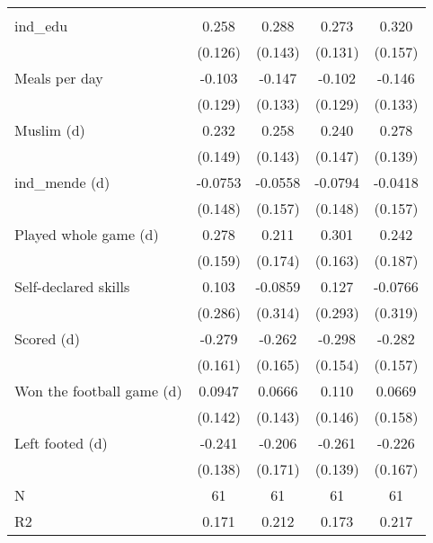 {\begin{tabular}{l*{4}{c}}
                    &                     &                     &                     &                     \\
[1em]
ind\_edu             &       0.258\sym{**} &       0.288\sym{**} &       0.273\sym{**} &       0.320\sym{**} \\
                    &     (0.126)         &     (0.143)         &     (0.131)         &     (0.157)         \\
[1em]
Meals per day       &      -0.103         &      -0.147         &      -0.102         &      -0.146         \\
                    &     (0.129)         &     (0.133)         &     (0.129)         &     (0.133)         \\
[1em]
Muslim (d)          &       0.232         &       0.258\sym{*}  &       0.240         &       0.278\sym{**} \\
                    &     (0.149)         &     (0.143)         &     (0.147)         &     (0.139)         \\
[1em]
ind\_mende (d)       &     -0.0753         &     -0.0558         &     -0.0794         &     -0.0418         \\
                    &     (0.148)         &     (0.157)         &     (0.148)         &     (0.157)         \\
[1em]
Played whole game (d)&       0.278\sym{*}  &       0.211         &       0.301\sym{*}  &       0.242         \\
                    &     (0.159)         &     (0.174)         &     (0.163)         &     (0.187)         \\
[1em]
Self-declared skills&       0.103         &     -0.0859         &       0.127         &     -0.0766         \\
                    &     (0.286)         &     (0.314)         &     (0.293)         &     (0.319)         \\
[1em]
Scored (d)          &      -0.279\sym{*}  &      -0.262         &      -0.298\sym{*}  &      -0.282\sym{*}  \\
                    &     (0.161)         &     (0.165)         &     (0.154)         &     (0.157)         \\
[1em]
Won the football game (d)&      0.0947         &      0.0666         &       0.110         &      0.0669         \\
                    &     (0.142)         &     (0.143)         &     (0.146)         &     (0.158)         \\
[1em]
Left footed (d)     &      -0.241\sym{*}  &      -0.206         &      -0.261\sym{*}  &      -0.226         \\
                    &     (0.138)         &     (0.171)         &     (0.139)         &     (0.167)         \\
\hline
N                   &          61         &          61         &          61         &          61         \\
R2                  &       0.171         &       0.212         &       0.173         &       0.217         \\
\hline\hline
\end{tabular}
}
